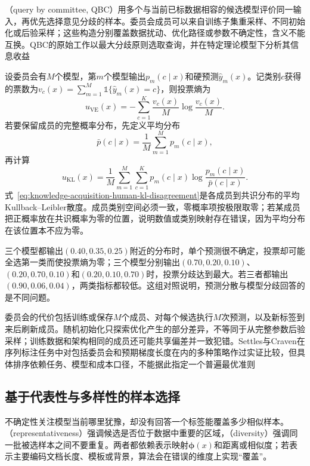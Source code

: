 （query by committee, QBC）用多个与当前已标数据相容的候选模型评价同一输入，再优先选择意见分歧的样本。委员会成员可以来自训练子集重采样、不同初始化或后验采样；这些构造分别覆盖数据扰动、优化路径或参数不确定性，含义不能互换。QBC的原始工作以最大分歧原则选取查询，并在特定理论模型下分析其信息收益

设委员会有$M$个模型，第$m$个模型输出$p_m(c\mid x)$和硬预测$\widehat y_m(x)$。记类别$c$获得的票数为$v_c(x)=\sum_{m=1}^{M}\mathbb{1}\{\widehat y_m(x)=c\}$，则投票熵为
\begin{equation}
  u_{\mathrm{VE}}(x)
  =-\sum_{c=1}^{K}\frac{v_c(x)}{M}
    \log\frac{v_c(x)}{M}.
  \label{eq:knowledge-acquisition-human-vote-entropy}
\end{equation}
若要保留成员的完整概率分布，先定义平均分布
\[
  \bar p(c\mid x)
  =\frac{1}{M}\sum_{m=1}^{M}p_m(c\mid x),
\]
再计算
\begin{equation}
  u_{\mathrm{KL}}(x)
  =\frac{1}{M}\sum_{m=1}^{M}
    \sum_{c=1}^{K}p_m(c\mid x)
    \log\frac{p_m(c\mid x)}{\bar p(c\mid x)}.
  \label{eq:knowledge-acquisition-human-kl-disagreement}
\end{equation}
式~\eqref{eq:knowledge-acquisition-human-kl-disagreement}是各成员到共识分布的平均Kullback--Leibler散度。成员类别空间必须一致，零概率项按极限取零；若某成员把正概率放在共识概率为零的位置，说明数值或类别映射存在错误，因为平均分布在该位置本不应为零。

三个模型都输出$(0.40,0.35,0.25)$附近的分布时，单个预测很不确定，投票却可能全选第一类而使投票熵为零；三个模型分别输出$(0.70,0.20,0.10)$、$(0.20,0.70,0.10)$和$(0.20,0.10,0.70)$时，投票分歧达到最大。若三者都输出$(0.90,0.06,0.04)$，两类指标都较低。这组对照说明，预测分散与模型分歧回答的是不同问题。

委员会的代价包括训练或保存$M$个成员、对每个候选执行$M$次预测，以及新标签到来后刷新成员。随机初始化只探索优化产生的部分差异，不等同于从完整参数后验采样；训练数据和架构相同的成员还可能共享偏差并一致犯错。Settles与Craven在序列标注任务中对包括委员会和预期梯度长度在内的多种策略作过实证比较，但具体排序依赖任务、模型和成本口径，不能据此指定一个普遍最优准则

\subsection{基于代表性与多样性的样本选择}
\label{sec:knowledge-acquisition-human-representative-diverse-selection}

不确定性关注模型当前哪里犹豫，却没有回答一个标签能覆盖多少相似样本。（representativeness）强调候选是否位于数据中重要的区域，（diversity）强调同一批被选样本之间不要重复。两者都依赖表示映射$\bm{\phi}(x)$和距离或相似度；若表示主要编码文档长度、模板或背景，算法会在错误的维度上实现“覆盖”。

